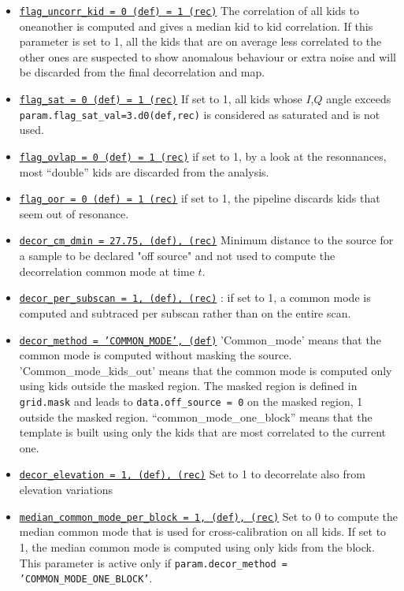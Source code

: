 \documentclass[a4paper,10pt]{article}
\begin{document}
\begin{itemize}
\item \underline{\tt flag\_uncorr\_kid = 0 (def) = 1 (rec)} The correlation of all kids to oneanother is
  computed and gives a median kid to kid correlation. If this parameter is set
  to 1, all the kids that are on average less correlated to the other ones are
  suspected to show anomalous behaviour or extra noise and will be discarded
  from the final decorrelation and map.

\item \underline{\tt flag\_sat = 0 (def) = 1 (rec)} If set to 1, all kids whose $I$,$Q$
  angle exceeds {\tt param.flag\_sat\_val=3.d0(def,rec)} is considered as
  saturated and is not used.

\item \underline{\tt flag\_ovlap = 0 (def) = 1 (rec)} if set to 1, by a look at the
  resonnances, most ``double'' kids are discarded from the analysis.

\item \underline{\tt flag\_oor = 0 (def) = 1 (rec)} if set to 1, the pipeline discards kids
  that seem out of resonance.
  
\item \underline{\tt decor\_cm\_dmin = 27.75, (def), (rec)} Minimum distance to
  the source for a sample to be declared "off source" and not used to compute
  the decorrelation common mode at time $t$.

\item \underline{\tt decor\_per\_subscan = 1, (def), (rec)} : if set to 1, a
  common mode is computed and subtraced per subscan rather than on the entire
  scan.

\item \underline{\tt decor\_method = 'COMMON\_MODE', (def)} 'Common\_mode' means
  that the common mode is computed without masking the
  source. 'Common\_mode\_kids\_out' means that the common mode is computed only
  using kids outside the masked region. The masked region is defined in {\tt
    grid.mask} and leads to {\tt data.off\_source = 0} on the masked region, 1
  outside the masked region. ``common\_mode\_one\_block'' means that the
  template is built using only the kids that are most correlated to the current one.

\item \underline{\tt decor\_elevation = 1, (def), (rec)}  Set to 1 to decorrelate
  also from elevation variations

\item \underline{\tt median\_common\_mode\_per\_block = 1, (def), (rec)} Set to 0 to
  compute the median common mode that is used for cross-calibration on all kids. If set to 1, the median common
  mode is computed using only kids from the block. This parameter is active only
  if {\tt param.decor\_method = 'COMMON\_MODE\_ONE\_BLOCK'}.


\end{itemize}
\end{document}
